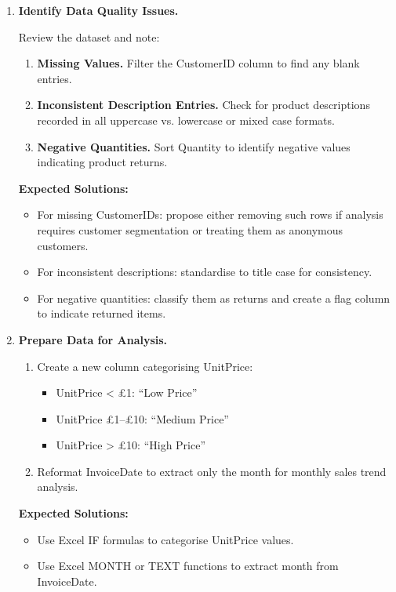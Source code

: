 \begin{enumerate}
	\item \textbf{Identify Data Quality Issues.}
	
	Review the dataset and note:
	
	\begin{enumerate}
		\item \textbf{Missing Values.} Filter the CustomerID column to find any blank entries.
		\item \textbf{Inconsistent Description Entries.} Check for product descriptions recorded in all uppercase vs. lowercase or mixed case formats.
		\item \textbf{Negative Quantities.} Sort Quantity to identify negative values indicating product returns.
	\end{enumerate}
	
	\textbf{Expected Solutions:}
	
	\begin{itemize}
		\item For missing CustomerIDs: propose either removing such rows if analysis requires customer segmentation or treating them as anonymous customers.
		\item For inconsistent descriptions: standardise to title case for consistency.
		\item For negative quantities: classify them as returns and create a flag column to indicate returned items.
	\end{itemize}
	
	\item \textbf{Prepare Data for Analysis.}
	
	\begin{enumerate}
		\item Create a new column categorising UnitPrice:
		\begin{itemize}
			\item UnitPrice < £1: “Low Price”
			\item UnitPrice £1–£10: “Medium Price”
			\item UnitPrice > £10: “High Price”
		\end{itemize}
		\item Reformat InvoiceDate to extract only the month for monthly sales trend analysis.
	\end{enumerate}
	
	\textbf{Expected Solutions:}
	
	\begin{itemize}
		\item Use Excel IF formulas to categorise UnitPrice values.
		\item Use Excel MONTH or TEXT functions to extract month from InvoiceDate.
	\end{itemize}
	

\end{enumerate}
